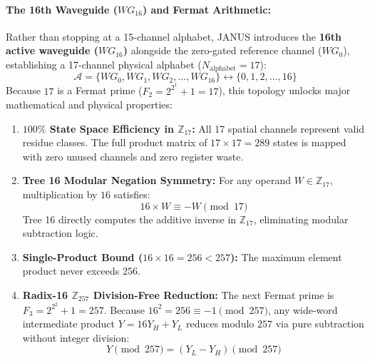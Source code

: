 \documentclass[journal]{IEEEtran}
\begin{document}
\paragraph{\textbf{The 16th Waveguide ($WG_{16}$) and Fermat Arithmetic:}}
Rather than stopping at a 15-channel alphabet, JANUS introduces the \textbf{16th active waveguide ($WG_{16}$)} alongside the zero-gated reference channel ($WG_0$), establishing a 17-channel physical alphabet ($N_{\mathrm{alphabet}} = 17$):
\begin{equation}
\mathcal{A} = \{ WG_0, WG_1, WG_2, \dots, WG_{16} \} \longleftrightarrow \{ 0, 1, 2, \dots, 16 \}
\end{equation}
Because $17$ is a Fermat prime ($F_2 = 2^{2^1} + 1 = 17$), this topology unlocks major mathematical and physical properties:
\begin{enumerate}
\item \textbf{$100\%$ State Space Efficiency in $\mathbb{Z}_{17}$:} All 17 spatial channels represent valid residue classes. The full product matrix of $17 \times 17 = 289$ states is mapped with zero unused channels and zero register waste.
\item \textbf{Tree 16 Modular Negation Symmetry:} For any operand $W \in \mathbb{Z}_{17}$, multiplication by $16$ satisfies:
\begin{equation}
16 \times W \equiv -W \pmod{17}
\end{equation}
Tree 16 directly computes the additive inverse in $\mathbb{Z}_{17}$, eliminating modular subtraction logic.
\item \textbf{Single-Product Bound ($16 \times 16 = 256 < 257$):} The maximum element product never exceeds 256.
\item \textbf{Radix-16 $\mathbb{Z}_{257}$ Division-Free Reduction:} The next Fermat prime is $F_3 = 2^{2^2} + 1 = 257$. Because $16^2 = 256 \equiv -1 \pmod{257}$, any wide-word intermediate product $Y = 16 Y_H + Y_L$ reduces modulo $257$ via pure subtraction without integer division:
\begin{equation}
Y \pmod{257} = (Y_L - Y_H) \pmod{257}
\end{equation}
\end{enumerate}
\end{document}
